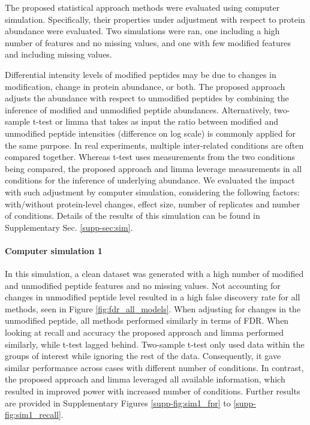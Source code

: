 \documentclass[mcp]{article}
\numberwithin{figure}{section} %
\numberwithin{table}{section}
\begin{document}
The proposed statistical approach methods were evaluated using computer simulation. Specifically, their properties under adjustment with respect to protein abundance were evaluated. Two simulations were ran, one including a high number of features and no missing values, and one with few modified features and including missing values.

Differential intensity levels of modified peptides may be due to changes in modification, change in protein abundance, or both. The proposed approach adjusts the abundance with respect to unmodified peptides by combining the inference of modified and unmodified peptide abundances. Alternatively, two-sample t-test or limma that takes as input the ratio between modified and unmodified peptide intensities (difference on log scale) is commonly applied for the same purpose. In real experiments, multiple inter-related conditions are often compared together. Whereas t-test uses measurements from the two conditions being compared, the proposed approach and limma leverage measurements in all conditions for the inference of underlying abundance. We evaluated the impact with such adjustment by computer simulation, considering the following factors: with/without protein-level changes, effect size, number of replicates and number of conditions. Details of the results of this simulation can be found in Supplementary Sec. \ref{supp-sec:sim}. 

\paragraph*{Computer simulation 1} 

In this simulation, a clean dataset was generated with a high number of modified and unmodified peptide features and no missing values. Not accounting for changes in unmodified peptide level resulted in a high false discovery rate for all methods, seen in Figure \ref{fig:fdr_all_models}. When adjusting for changes in the unmodified peptide, all methods performed similarly in terms of FDR. When looking at recall and accuracy the proposed approach and limma performed similarly, while t-test lagged behind. Two-sample t-test only used data within the groups of interest while ignoring the rest of the data. Consequently, it gave similar performance across cases with different number of conditions. In contrast, the proposed approach and limma leveraged all available information, which resulted in improved power with increased number of conditions. Further results are provided in Supplementary Figures \ref{supp-fig:sim1_fpr} to \ref{supp-fig:sim1_recall}. 
\end{document}
